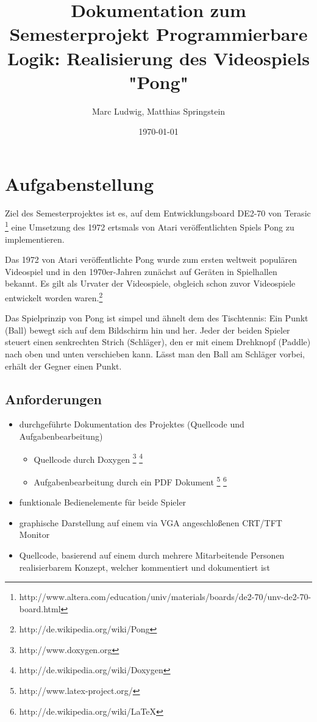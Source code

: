 \documentclass{article}
\title{Dokumentation zum Semesterprojekt Programmierbare Logik: Realisierung des Videospiels "Pong"}
\author{Marc Ludwig, Matthias Springstein}
\date{\today}
\begin{document}
\maketitle
\newpage

\tableofcontents
\newpage

\section{Aufgabenstellung}
Ziel des Semesterprojektes ist es, auf dem Entwicklungsboard DE2-70 von Terasic 
\footnote{http://www.altera.com/education/univ/materials/boards/de2-70/unv-de2-70-board.html}
eine Umsetzung des 1972 ertsmals von Atari veröffentlichten Spiels Pong zu implementieren.

Das 1972 von Atari veröffentlichte Pong wurde zum ersten weltweit populären Videospiel und in den 
1970er-Jahren zunächst auf Geräten in Spielhallen bekannt. Es gilt als Urvater der Videospiele, 
obgleich schon zuvor Videospiele entwickelt worden waren.\footnote{http://de.wikipedia.org/wiki/Pong}

Das Spielprinzip von Pong ist simpel und ähnelt dem des Tischtennis: Ein Punkt (Ball) bewegt sich 
auf dem Bildschirm hin und her. Jeder der beiden Spieler steuert einen senkrechten Strich 
(Schläger), den er mit einem Drehknopf (Paddle) nach oben und unten verschieben kann. Lässt man 
den Ball am Schläger vorbei, erhält der Gegner einen Punkt.


\subsection{Anforderungen}
\begin{itemize}
  \item durchgeführte Dokumentation des Projektes (Quellcode und Aufgabenbearbeitung)
  	\begin{itemize} 
  	\item Quellcode durch Doxygen 
  		\footnote{http://www.doxygen.org} 
  		\footnote{http://de.wikipedia.org/wiki/Doxygen}
  	\item Aufgabenbearbeitung durch ein PDF Dokument
  		\footnote{http://www.latex-project.org/}
  		\footnote{http://de.wikipedia.org/wiki/LaTeX}
  	\end{itemize} 
  \item funktionale Bedienelemente für beide Spieler
  \item graphische Darstellung auf einem via VGA angeschloßenen CRT/TFT Monitor
  \item Quellcode, basierend auf einem durch mehrere Mitarbeitende Personen realisierbarem Konzept, 
  		welcher kommentiert und dokumentiert ist
\end{itemize}
\end{document}
